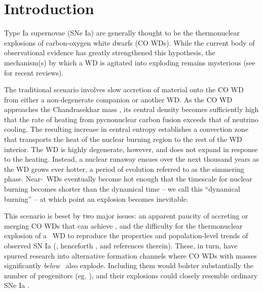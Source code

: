 \section{Introduction}
\label{sec:c5_intro}

Type Ia supernovae (SNe Ia) are generally thought to be the thermonuclear explosions of carbon-oxygen white dwarfs (CO WDs).  While the current body of observational evidence has greatly strengthened this hypothesis, the mechanism(s) by which a WD is agitated into exploding remains mysterious (see \citealt{howe11, hill+13, maozmn14} for recent reviews).  

The traditional scenario involves slow accretion of material onto the CO WD from either a non-degenerate companion or another WD.  As the CO WD approaches the Chandrasekhar mass \Mch, its central density becomes sufficiently high that the rate of heating from pycnonuclear carbon fusion exceeds that of neutrino cooling.  The resulting increase in central entropy establishes a convection zone that transports the heat of the nuclear burning region to the rest of the WD interior.  The WD is highly degenerate, however, and does not expand in response to the heating.  Instead, a nuclear runaway ensues over the next thousand years as the WD grows ever hotter, a period of evolution referred to as the simmering phase.  Near-\Mch\ WDs eventually become hot enough that the timescale for nuclear burning becomes shorter than the dynamical time -- we call this ``dynamical burning'' -- at which point an explosion becomes inevitable.

This scenario is beset by two major issues: an apparent paucity of accreting or merging CO WDs that can achieve \Mch, and the difficulty for the thermonuclear explosion of a \Mch\ WD to reproduce the properties and population-level trends of observed SN Ia (\citealt{vkercj10}, henceforth \citeal{vkercj10}, and references therein).  These, in turn, have spurred research into alternative formation channels where CO WDs with masses significantly \textit{below} \Mch\ also explode.  Including them would bolster substantially the number of progenitors (eg. \citealt{badem12}), and their explosions could closely resemble ordinary SNe Ia \citep{shig+92, sim+10}.

